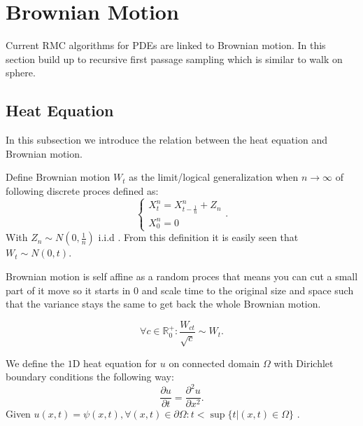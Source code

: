 \documentclass[a4paper,12pt]{article}
\begin{document}
\section{Brownian Motion}

Current RMC algorithms for PDEs are linked to Brownian motion. In this
section build up to recursive first passage sampling which is similar to
walk on sphere.



\subsection{Heat Equation}
In this subsection we introduce the relation between the heat equation and
Brownian motion.

\begin{definition}
    Define Brownian motion $W_{t}$ as the limit/logical generalization
    when $n \rightarrow \infty$ of following discrete proces defined as:
    \begin{equation}
        \begin{cases}
            X_{t}^{n} = X_{t-\frac{1}{n}}^{n} + Z_{n} \\
            X^{n}_{0}=0
        \end{cases}.
    \end{equation}
    With $Z_{n}\sim N(0,\frac{1}{n})$ i.i.d . From this definition it is easily seen that
    $W_{t} \sim N(0,t)$.
\end{definition}


\begin{lemma} \label{lem:self affine}
    Brownian motion is self affine as a random proces that means you can cut a small
    part of it move so it starts in $0$ and scale time to the original size
    and space such that the variance stays the same to get back the whole Brownian motion.

    \begin{equation}
        \forall c \in \mathbb{R}^{+}_{0}: \frac{W_{ct}}{\sqrt{c}} \sim W_{t}.
    \end{equation}
\end{lemma}

\begin{definition} \label{def:heat equation}
    We define the $1$D heat equation for $u$ on connected domain $\Omega$
    with  Dirichlet boundary conditions the following way:
    \begin{equation}
        \frac{\partial u}{\partial t} = \frac{\partial^{2} u}{\partial x ^{2}}.
    \end{equation}
    Given $u(x,t)=\psi(x,t) ,\forall (x,t) \in \partial \Omega: t<\sup \{
        t| (x,t) \in \Omega\}$ .
\end{definition}
\end{document}
